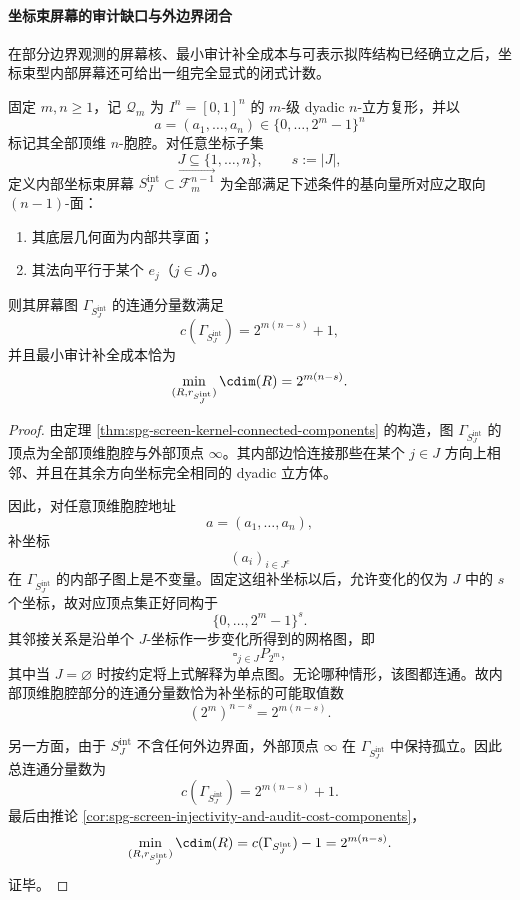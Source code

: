 \paragraph{坐标束屏幕的审计缺口与外边界闭合}
在部分边界观测的屏幕核、最小审计补全成本与可表示拟阵结构已经确立之后，坐标束型内部屏幕还可给出一组完全显式的闭式计数。

\begin{theorem}[内部坐标束屏幕的连通分量与审计补全成本闭式]\label{thm:spg-internal-coordinate-bundle-screen-cost-closed-form}
固定 \(m,n\ge 1\)，记 \(\mathcal Q_m\) 为 \(I^n=[0,1]^n\) 的 \(m\)-级 dyadic \(n\)-立方复形，并以
\[
a=(a_1,\dots,a_n)\in\{0,\dots,2^m-1\}^n
\]
标记其全部顶维 \(n\)-胞腔。对任意坐标子集
\[
J\subseteq \{1,\dots,n\},
\qquad
s:=|J|,
\]
定义内部坐标束屏幕 \(S_J^{\mathrm{int}}\subset \overrightarrow{\mathcal F_m^{n-1}}\) 为全部满足下述条件的基向量所对应之取向 \((n-1)\)-面：
\begin{enumerate}
  \item 其底层几何面为内部共享面；
  \item 其法向平行于某个 \(e_j\)（\(j\in J\)）。
\end{enumerate}
则其屏幕图 \(\Gamma_{S_J^{\mathrm{int}}}\) 的连通分量数满足
\[
c(\Gamma_{S_J^{\mathrm{int}}})=2^{m(n-s)}+1,
\]
并且最小审计补全成本恰为
\[
\min_{(R,r_{S_J^{\mathrm{int}}})}\cdim(R)=2^{m(n-s)}.
\]
\end{theorem}
\begin{proof}
由定理 \ref{thm:spg-screen-kernel-connected-components} 的构造，图 \(\Gamma_{S_J^{\mathrm{int}}}\) 的顶点为全部顶维胞腔与外部顶点 \(\infty\)。其内部边恰连接那些在某个 \(j\in J\) 方向上相邻、并且在其余方向坐标完全相同的 dyadic 立方体。

因此，对任意顶维胞腔地址
\[
a=(a_1,\dots,a_n),
\]
补坐标
\[
(a_i)_{i\in J^c}
\]
在 \(\Gamma_{S_J^{\mathrm{int}}}\) 的内部子图上是不变量。固定这组补坐标以后，允许变化的仅为 \(J\) 中的 \(s\) 个坐标，故对应顶点集正好同构于
\[
\{0,\dots,2^m-1\}^s.
\]
其邻接关系是沿单个 \(J\)-坐标作一步变化所得到的网格图，即
\[
\square_{j\in J} P_{2^m},
\]
其中当 \(J=\varnothing\) 时按约定将上式解释为单点图。无论哪种情形，该图都连通。故内部顶维胞腔部分的连通分量数恰为补坐标的可能取值数
\[
(2^m)^{n-s}=2^{m(n-s)}.
\]

另一方面，由于 \(S_J^{\mathrm{int}}\) 不含任何外边界面，外部顶点 \(\infty\) 在 \(\Gamma_{S_J^{\mathrm{int}}}\) 中保持孤立。因此总连通分量数为
\[
c(\Gamma_{S_J^{\mathrm{int}}})=2^{m(n-s)}+1.
\]
最后由推论 \ref{cor:spg-screen-injectivity-and-audit-cost-components}，
\[
\min_{(R,r_{S_J^{\mathrm{int}}})}\cdim(R)
=
c(\Gamma_{S_J^{\mathrm{int}}})-1
=
2^{m(n-s)}.
\]
证毕。
\end{proof}

